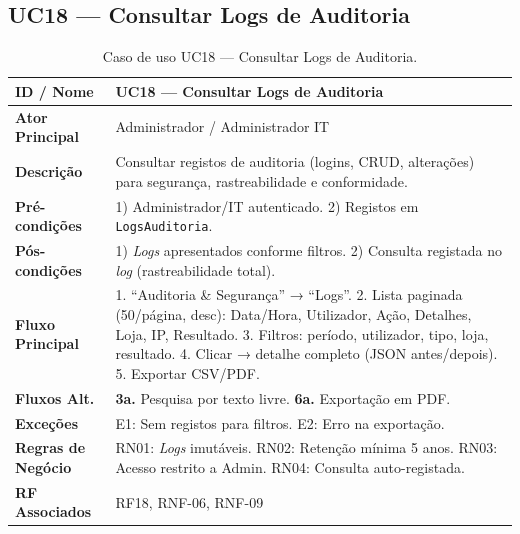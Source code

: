 \documentclass[a4paper,12pt]{scrreprt}
\begin{document}
\subsection*{UC18 --- Consultar Logs de Auditoria}
\begin{table}[H]
\centering\small
\begin{tabular}{|p{3cm}|p{11cm}|}
\hline
\textbf{ID / Nome} & UC18 --- Consultar Logs de Auditoria \\
\hline
\textbf{Ator Principal} & Administrador / Administrador IT \\
\hline
\textbf{Descrição} & Consultar registos de auditoria (logins, CRUD, alterações) para segurança, rastreabilidade e conformidade. \\
\hline
\textbf{Pré-condições} & 1) Administrador/IT autenticado. 2) Registos em \texttt{LogsAuditoria}. \\
\hline
\textbf{Pós-condições} & 1) \textit{Logs} apresentados conforme filtros. 2) Consulta registada no \textit{log} (rastreabilidade total). \\
\hline
\textbf{Fluxo Principal} & 1. ``Auditoria \& Segurança'' → ``Logs''. 2. Lista paginada (50/página, desc): Data/Hora, Utilizador, Ação, Detalhes, Loja, IP, Resultado. 3. Filtros: período, utilizador, tipo, loja, resultado. 4. Clicar → detalhe completo (JSON antes/depois). 5. Exportar CSV/PDF. \\
\hline
\textbf{Fluxos Alt.} & \textbf{3a.} Pesquisa por texto livre. \textbf{6a.} Exportação em PDF. \\
\hline
\textbf{Exceções} & E1: Sem registos para filtros. E2: Erro na exportação. \\
\hline
\textbf{Regras de Negócio} & RN01: \textit{Logs} imutáveis. RN02: Retenção mínima 5 anos. RN03: Acesso restrito a Admin. RN04: Consulta auto-registada. \\
\hline
\textbf{RF Associados} & RF18, RNF-06, RNF-09 \\
\hline
\end{tabular}
\caption{Caso de uso UC18 --- Consultar Logs de Auditoria.}
\end{table}

\end{document}
